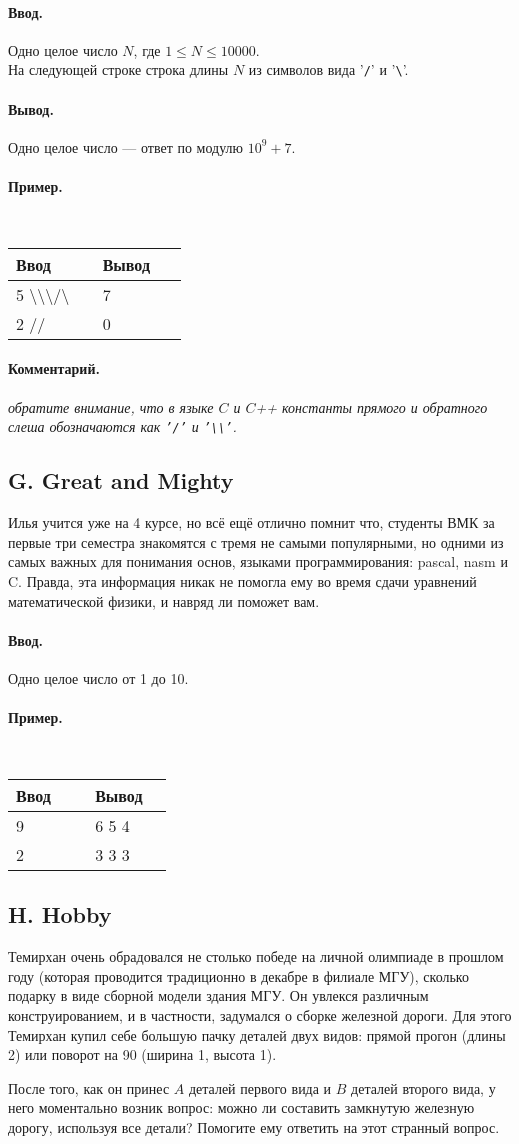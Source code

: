 \documentclass[12pt, a4paper]{article}
\newcommand{\informat}[1]
{
	\paragraph{Ввод.\\} #1
}
\newcommand{\outformat}[1]
{
	\paragraph{Вывод.\\} #1
}
\newcommand{\examplee}[4]
{
	\paragraph{Пример.\\}
	{\tt
	\begin{tabular}{|p{0.4\linewidth}|p{0.4\linewidth}|}
	\hline
	Ввод 	& Вывод  	\\
	\hline
	#1 		& #2 		\\
	\hline
	#3		& #4		\\
	\hline
	\end{tabular}
	}
}
\newcommand{\excomm}[1]
{
	\paragraph{Комментарий. \\}
	\textit{#1}
}
\begin{document}
\informat{Одно целое число $N$, где $1 \le N \le 10000$. \\
На следующей строке строка длины $N$ из символов вида  '{\tt /}' и '{\tt \textbackslash}'.}

\outformat{Одно целое число --- ответ по модулю $10^9+7$.}

\examplee{
5 \newline
\textbackslash\textbackslash\textbackslash/\textbackslash}
{7}
{2 \newline
//}
{0}

\excomm{обратите внимание, что в языке $C$ и $C$++ константы прямого и обратного слеша обозначаются как {\tt '/'} и {\tt '\textbackslash\textbackslash'}.}



\subsection*{G. Great and Mighty}

Илья учится уже на 4 курсе, но всё ещё отлично помнит что, студенты ВМК за первые три семестра знакомятся с тремя не самыми популярными, но одними из самых важных для понимания основ, языками программирования: pascal, nasm и C. Правда, эта информация никак не помогла ему во время сдачи уравнений математической физики, и навряд ли поможет вам.

\informat{Одно целое число от 1 до 10.}

\examplee{9}{6 5 4}{2}{3 3 3}



\subsection*{H. Hobby}

Темирхан очень обрадовался не столько победе на личной олимпиаде в прошлом году (которая проводится традиционно в декабре в филиале МГУ), сколько подарку в виде сборной модели здания МГУ. Он увлекся различным конструированием, и в частности, задумался о сборке железной дороги. Для этого Темирхан купил себе большую пачку деталей двух видов: прямой прогон (длины 2) или поворот на 90 (ширина 1, высота 1). 



После того, как он принес $A$ деталей первого вида и $B$ деталей второго вида, у него моментально возник вопрос: можно ли составить замкнутую железную дорогу, используя все детали? Помогите ему ответить на этот странный вопрос.
\end{document}
